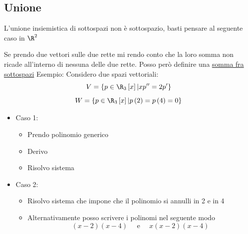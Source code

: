 \documentclass[12pt,a4paper,oneside]{article}
\begin{document}
\subsection{Unione}
L'unione insiemistica di sottospazi non è sottospazio, basti pensare al seguente caso in $\R^{2}$
\begin{center}
\end{center}
Se prendo due vettori sulle due rette mi rendo conto che la loro somma non ricade all'interno di nessuna delle due rette. Posso però definire una \underline{somma fra sottospazi}
Esempio:
Considero due spazi vettoriali:
\[
	V=\left\{ p \in  \R_3\left[ x \right] | x p '' = 2p'  \right\}
\]
\[
	W = \left\{ p \in  \R_3 \left[ x \right] | p\left( 2 \right) = p\left( 4 \right) = 0 \right\}
\]
\begin{itemize}
	\item Caso 1:
	      \begin{itemize}
		      \item Prendo polinomio generico
		      \item Derivo
		      \item Risolvo sistema
	      \end{itemize}
	\item Caso 2:
	      \begin{itemize}
		      \item Risolvo sistema che impone che il polinomio si annulli in  2 e in 4
		      \item Alternativamente posso scrivere i polinomi nel seguente modo
		            \[
			            \left( x-2 \right) \left( x-4 \right) \quad \text{ e } \quad x\left( x-2 \right) \left( x-4 \right)
		            \]
	      \end{itemize}
\end{itemize}
\end{document}
